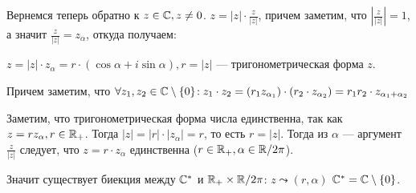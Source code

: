 Вернемся теперь обратно к $z \in \mathbb{C}, z \neq 0$.  $z = |z| \cdot \frac{z}{|z|}$, причем заметим, что $|\frac{z}{|z|}| = 1$, а значит $\frac{z}{|z|} = z_{\alpha}$, откуда получаем:
\begin{definition}
    $z = |z|\cdot z_\alpha = r\cdot(\cos \alpha + i \sin \alpha), r = |z|$ --- тригонометрическая форма $z$.
\end{definition}

Причем заметим, что $\forall z_1, z_2 \in \mathbb{C} \setminus \{0\}\!: z_1 \cdot z_2 = (r_1 z_{\alpha_1}) \cdot (r_2 \cdot z_{\alpha_2}) = r_1r_2 \cdot z_{\alpha_1 + \alpha_2}$

Заметим, что тригонометрическая форма числа единственна, так как $z = r z_\alpha, r \in \mathbb{R}_+$. Тогда  $|z| = |r| \cdot |z_\alpha| = r$, то есть  $r = |z|$. Тогда из $\alpha$ --- аргумент  $\frac{z}{|z|}$ следует, что $z = r \cdot z_\alpha$ единственна ($r \in \mathbb{R}_+, \alpha \in \mathbb{R} / 2\pi$). 

Значит существует биекция между $\mathbb{C}^*$ и $\mathbb{R}_+ \times \mathbb{R} / 2\pi$: $z \leadsto (r, \alpha)$  $\mathbb{C}^* = \mathbb{C} \setminus \{0\}$. 

